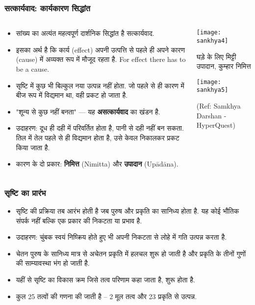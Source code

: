 \begin{frame}[fragile]\frametitle{सत्कार्यवाद: कार्यकारण सिद्धांत}
\begin{columns}
    \begin{column}[T]{0.6\linewidth}
      \begin{itemize}
		\item सांख्य का अत्यंत महत्वपूर्ण दार्शनिक सिद्धांत है सत्कार्यवाद.
		\item इसका अर्थ है कि कार्य (effect) अपनी उत्पत्ति से पहले ही अपने कारण (cause) में अव्यक्त रूप में मौजूद रहता है. For effect there has to be a cause.
        \item सृष्टि में कुछ भी बिल्कुल नया उत्पन्न नहीं होता. जो पहले से ही कारण में बीज रूप में विद्यमान था, वही प्रकट हो जाता है.
        \item "शून्य से कुछ नहीं बनता" — यह \textbf{असत्कार्यवाद} का खंडन है.
        \item उदाहरण: दूध ही दही में परिवर्तित होता है, पानी से दही नहीं बन सकता. तिल में तेल पहले से ही विद्यमान होता है, उसे केवल निकालकर प्रकट किया जाता है.
        \item कारण के दो प्रकार: \textbf{निमित्त} (Nimitta) और \textbf{उपादान} (Upādāna).
      \end{itemize}
    \end{column}
    \begin{column}[T]{0.4\linewidth}
      \begin{center}
        \texttt{[image: sankhya4]}
		
		घड़े के लिए मिट्टी उपादान, कुम्हार निमित्त
		
        \texttt{[image: sankhya5]}
		
		{\tiny (Ref: Samkhya Darshan - HyperQuest)}
		
      \end{center}	
    \end{column}
\end{columns}
\end{frame}

\begin{frame}[fragile]\frametitle{सृष्टि का प्रारंभ}
      \begin{itemize}
	\item सृष्टि की प्रक्रिया तब आरंभ होती है जब पुरुष और प्रकृति का सानिध्य होता है. यह कोई भौतिक संपर्क नहीं बल्कि एक प्रकार की निकटता या प्रभाव है.
	\item उदाहरण: चुंबक स्वयं निष्क्रिय होते हुए भी अपनी निकटता से लोहे में गति उत्पन्न करता है.
	\item चेतन पुरुष के सानिध्य मात्र से अचेतन प्रकृति में हलचल शुरू हो जाती है और प्रकृति के तीनों गुणों की साम्यावस्था भंग हो जाती है.
	\item यहीं से सृष्टि का विकास क्रम जिसे तत्व परिणाम कहा जाता है, शुरू होता है.
    \item कुल 25 तत्वों की गणना की जाती है – 2 मूल तत्व और 23 प्रकृति से उत्पन्न.
	  \end{itemize}
\end{frame}

